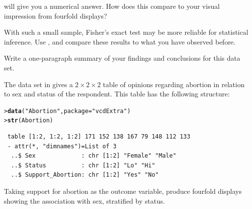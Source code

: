 \documentclass[10pt]{report}\usepackage[]{graphicx}\usepackage[]{color}
\makeatletter
\newcommand{\hlstr}[1]{\textcolor[rgb]{0.192,0.494,0.8}{#1}}%
\newcommand{\hlstd}[1]{\textcolor[rgb]{0.345,0.345,0.345}{#1}}%
\newcommand{\hlkwc}[1]{\textcolor[rgb]{0.333,0.667,0.333}{#1}}%
\newcommand{\hlkwd}[1]{\textcolor[rgb]{0.737,0.353,0.396}{\textbf{#1}}}%
\newenvironment{kframe}{%
 \def\at@end@of@kframe{}%
 \ifinner\ifhmode%
  \def\at@end@of@kframe{\end{minipage}}%
  \begin{minipage}{\columnwidth}%
 \fi\fi%
 \def\FrameCommand##1{\hskip\@totalleftmargin \hskip-\fboxsep
 \colorbox{shadecolor}{##1}\hskip-\fboxsep
     \hskip-\linewidth \hskip-\@totalleftmargin \hskip\columnwidth}%
 \MakeFramed {\advance\hsize-\width
   \@totalleftmargin\z@ \linewidth\hsize
   \@setminipage}}%
 {\par\unskip\endMakeFramed%
 \at@end@of@kframe}
\newenvironment{knitrout}{}{} %
\renewenvironment{knitrout}{\small\renewcommand{\baselinestretch}{.85}}{} %
\makeatother
\begin{document}
\begin{Exercises}
\begin{enumerate*}
    \item {} will give you a numerical answer.  How does
    this compare to your visual impression from fourfold displays?
    \begin{ans}
    \end{ans}
    
    \item With such a small sample, Fisher's exact test may be more reliable for statistical
    inference.  Use , and compare these results to what you have
    observed before.
    \begin{ans}
    \end{ans}
    
    \item Write a one-paragraph summary of your findings and conclusions for this data set.
    \begin{ans}
    \end{ans}
    
  \end{enumerate*}

  \exercise The data set  in  gives a $2 \times 2 \times 2$
  table of opinions regarding abortion in relation to sex and status of the
  respondent. This table has the following structure:
\begin{knitrout}\footnotesize
{}\color{fgcolor}\begin{kframe}
\begin{alltt}
\hlstd{> }\hlkwd{data}\hlstd{(}\hlstr{"Abortion"}\hlstd{,} \hlkwc{package} \hlstd{=} \hlstr{"vcdExtra"}\hlstd{)}
\hlstd{> }\hlkwd{str}\hlstd{(Abortion)}
\end{alltt}
\begin{verbatim}
 table [1:2, 1:2, 1:2] 171 152 138 167 79 148 112 133
 - attr(*, "dimnames")=List of 3
  ..$ Sex             : chr [1:2] "Female" "Male"
  ..$ Status          : chr [1:2] "Lo" "Hi"
  ..$ Support_Abortion: chr [1:2] "Yes" "No"
\end{verbatim}
\end{kframe}
\end{knitrout}
  \begin{enumerate*}
    \item Taking support for abortion as the outcome variable, produce fourfold displays   
    showing the association with sex, stratified by status.
    \begin{ans}
    \end{ans}
    

\end{enumerate*}
\end{Exercises}
\end{document}
